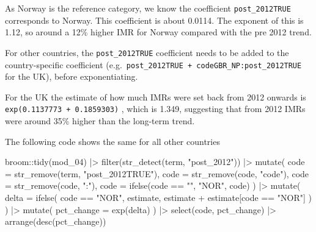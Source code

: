 \documentclass[
  letterpaper,
  DIV=11,
  numbers=noendperiod]{scrartcl}
\newenvironment{Shaded}{\begin{snugshade}}{\end{snugshade}}
\newcommand{\AttributeTok}[1]{\textcolor[rgb]{0.40,0.45,0.13}{#1}}
\newcommand{\FunctionTok}[1]{\textcolor[rgb]{0.28,0.35,0.67}{#1}}
\newcommand{\NormalTok}[1]{\textcolor[rgb]{0.00,0.23,0.31}{#1}}
\newcommand{\SpecialCharTok}[1]{\textcolor[rgb]{0.37,0.37,0.37}{#1}}
\newcommand{\StringTok}[1]{\textcolor[rgb]{0.13,0.47,0.30}{#1}}
\begin{document}
As Norway is the reference category, we know the coefficient
\texttt{post\_2012TRUE} corresponds to Norway. This coefficient is about
0.0114. The exponent of this is 1.12, so around a 12\% higher IMR for
Norway compared with the pre 2012 trend.

For other countries, the \texttt{post\_2012TRUE} coefficient needs to be
added to the country-specific coefficient
(e.g.~\texttt{post\_2012TRUE\ +\ codeGBR\_NP:post\_2012TRUE} for the
UK), before exponentiating.

For the UK the estimate of how much IMRs were set back from 2012 onwards
is \texttt{exp(0.1137773\ +\ 0.1859303)} , which is 1.349, suggesting
that from 2012 IMRs were around 35\% higher than the long-term trend.

The following code shows the same for all other countries

\begin{Shaded}
\begin{Highlighting}[]
\NormalTok{broom}\SpecialCharTok{::}\FunctionTok{tidy}\NormalTok{(mod\_04) }\SpecialCharTok{|\textgreater{}} 
  \FunctionTok{filter}\NormalTok{(}\FunctionTok{str\_detect}\NormalTok{(term, }\StringTok{"post\_2012"}\NormalTok{)) }\SpecialCharTok{|\textgreater{}} 
  \FunctionTok{mutate}\NormalTok{(}
    \AttributeTok{code =} \FunctionTok{str\_remove}\NormalTok{(term, }\StringTok{"post\_2012TRUE"}\NormalTok{),}
    \AttributeTok{code =} \FunctionTok{str\_remove}\NormalTok{(code, }\StringTok{"code"}\NormalTok{),}
    \AttributeTok{code =} \FunctionTok{str\_remove}\NormalTok{(code, }\StringTok{":"}\NormalTok{),}
    \AttributeTok{code =} \FunctionTok{ifelse}\NormalTok{(code }\SpecialCharTok{==} \StringTok{""}\NormalTok{, }\StringTok{"NOR"}\NormalTok{, code)}
\NormalTok{  ) }\SpecialCharTok{|\textgreater{}} 
  \FunctionTok{mutate}\NormalTok{(}
    \AttributeTok{delta =} \FunctionTok{ifelse}\NormalTok{(}
\NormalTok{      code }\SpecialCharTok{==} \StringTok{"NOR"}\NormalTok{, }
\NormalTok{      estimate,}
\NormalTok{      estimate }\SpecialCharTok{+}\NormalTok{ estimate[code }\SpecialCharTok{==} \StringTok{"NOR"}\NormalTok{]}
\NormalTok{    )}
\NormalTok{  ) }\SpecialCharTok{|\textgreater{}} 
  \FunctionTok{mutate}\NormalTok{(}
    \AttributeTok{pct\_change =} \FunctionTok{exp}\NormalTok{(delta) }
\NormalTok{  ) }\SpecialCharTok{|\textgreater{}} 
  \FunctionTok{select}\NormalTok{(code, pct\_change) }\SpecialCharTok{|\textgreater{}} 
  \FunctionTok{arrange}\NormalTok{(}\FunctionTok{desc}\NormalTok{(pct\_change))}
\end{Highlighting}
\end{Shaded}
\end{document}
